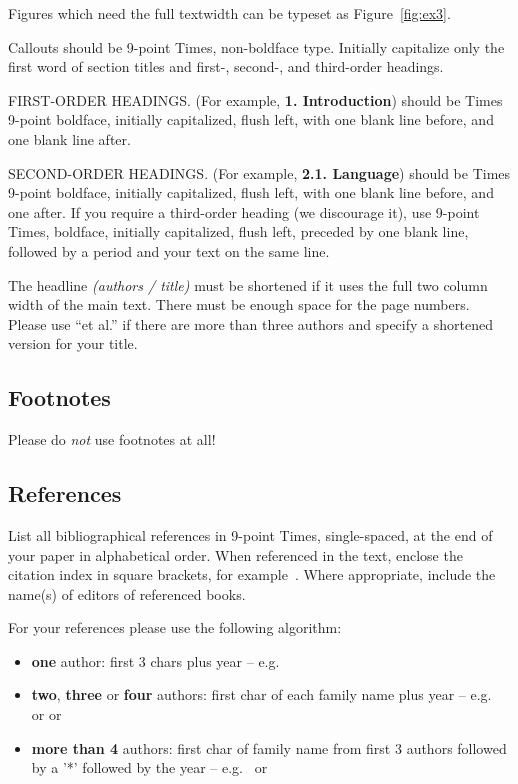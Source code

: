 \noindent
Figures which need the full textwidth can be typeset as Figure~\ref{fig:ex3}.

\noindent Callouts should be 9-point Times, non-boldface type. Initially
capitalize only the first word of section titles and first-, second-, and
third-order headings.

FIRST-ORDER HEADINGS. (For example, \textbf{1. Introduction}) should be Times
9-point boldface, initially capitalized, flush left, with one blank line
before, and one blank line after.

SECOND-ORDER HEADINGS. (For example, \textbf{2.1. Language}) should be Times
9-point boldface, initially capitalized, flush left, with one blank line
before, and one after. If you require a third-order heading (we discourage
it), use 9-point Times, boldface, initially capitalized, flush left, preceded
by one blank line, followed by a period and your text on the same line.

The headline \emph{(authors / title)} must be shortened if it uses the full 
two column width of the main text.
There must be enough space for the page numbers. Please use ``et al.'' if 
there are more than three authors and specify a shortened version for your title.
\subsection{Footnotes}

Please do \emph{not} use footnotes at all!


\subsection{References}

List all bibliographical references in 9-point Times, single-spaced, at the
end of your paper in alphabetical order. When referenced in the text, enclose
the citation index in square brackets, for example~\cite{Lous90}. Where
appropriate, include the name(s) of editors of referenced books.

For your references please use the following algorithm:
\begin{itemize} 
\item \textbf{one} author: first 3 chars plus year -- 
      e.g.\ \cite{Lous90}
\item \textbf{two}, \textbf{three} or \textbf{four} authors: first char
      of each family name plus year --  e.g.\ \cite{Fellner-Helmberg93} 
      or \cite{Kobbelt97-USHDR} or \cite{Lafortune97-NARF}
\item \textbf{more than 4} authors: first char of family name from 
      first 3 authors followed by a '*' followed by the year -- 
      e.g.\ \cite{Buhmann:1998:DCQ} or \cite{FolDamFeiHug.etal93} 
\end{itemize}

